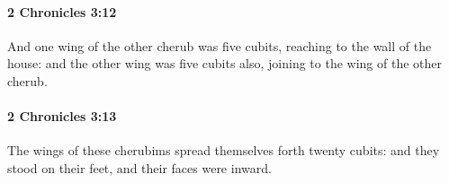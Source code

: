 		\paragraph{2 Chronicles 3:12} %
			\label{2CHRONICLES-3-12}

			And one wing of the other cherub was five cubits, reaching to the wall of the house: and the other wing was five cubits also, joining to the wing of the other cherub.


		\paragraph{2 Chronicles 3:13} %
			\label{2CHRONICLES-3-13}

			The wings of these cherubims spread themselves forth twenty cubits: and they stood on their feet, and their faces were inward.


